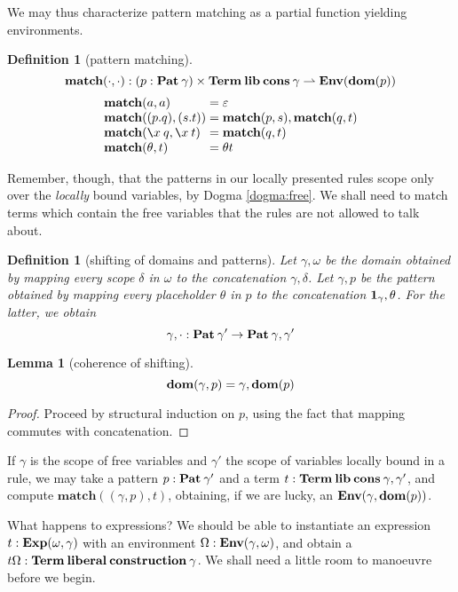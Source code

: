 \documentclass{jfp1}
\newtheorem{lemma}[theorem]{Lemma}
\newtheorem{definition}[theorem]{Definition}
\newcommand{\emp}{\varepsilon}
\begin{document}
We may thus characterize pattern matching as a partial function yielding environments.

\newcommand{\match}[2]{\textbf{match}(#1,#2)}
\begin{definition}[pattern matching]
  \[\match\cdot\cdot : (p : \Pat{\gamma})\times\Tm\lib\cons\gamma
    \mto \Env{\dom p}\]
  \[\begin{array}{l@{\;=\;}l}
    \match aa & \emp \\
    \match{(p.q)}{(s.t)} & \match ps, \match qt \\
    \match{\la x q}{\la x t} & \match qt \\
    \match\theta t & \theta t
  \end{array}\]
\end{definition}

Remember, though, that the patterns in our locally presented rules scope only over the
\emph{locally} bound variables, by Dogma \ref{dogma:free}. We shall need to match
terms which contain the free variables that the rules are not allowed to talk about.

\begin{definition}[shifting of domains and patterns]
  Let $\gamma,\omega$ be the domain obtained by mapping every scope $\delta$ in $\omega$
  to the concatenation $\gamma,\delta$. Let $\gamma,p$ be the pattern obtained by
  mapping every placeholder $\theta$ in $p$ to the concatenation $\mathbf{1}_\gamma,\theta$.
  For the latter, we obtain
    \[\gamma,\cdot : \textbf{Pat}\:\gamma' \to \textbf{Pat}\:\gamma,\gamma' \]
\end{definition}

\begin{lemma}[coherence of shifting]
  \[\textbf{dom}(\gamma,p) = \gamma,\textbf{dom}(p)
  \]
\end{lemma}
\begin{proof}
  Proceed by structural induction on $p$, using the fact that mapping commutes with
  concatenation.
\end{proof}

If $\gamma$ is the scope of free variables and $\gamma'$ the scope of variables
locally bound in a rule, we may take a pattern $p : \textbf{Pat}\:\gamma'$ and
a term $t : \mathbf{Term}\:\textbf{lib}\:\textbf{cons}\:\gamma,\gamma'$,
and compute $\match{(\gamma,p)}t$, obtaining, if we are lucky, an $\textbf{Env}(\gamma,\textbf{dom}(p))$.

What happens to expressions? We should be able to instantiate an expression
$t : \textbf{Exp}(\omega,\gamma)$ with an environment $\Omega : \textbf{Env}(\gamma,\omega)$, and obtain a
$t\Omega : \mathbf{Term}\:\textbf{liberal}\:\textbf{construction}\:\gamma$. We shall need a little
room to manoeuvre before we begin.
\end{document}
